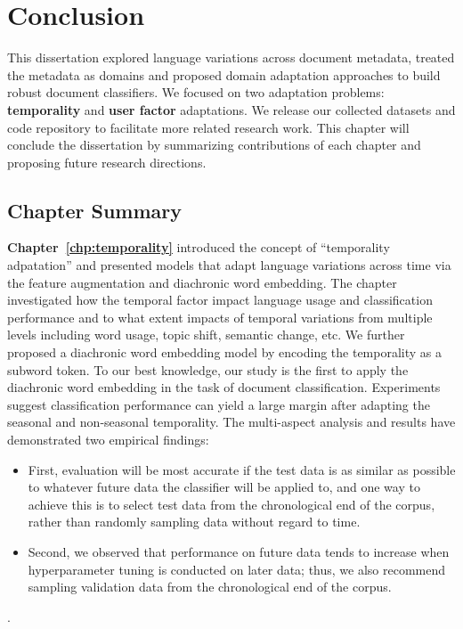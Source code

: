 \chapter{Conclusion}
\label{chp:conclusion}

This dissertation explored language variations across document metadata, treated the metadata as domains and proposed domain adaptation approaches to build robust document classifiers.
We focused on two adaptation problems: \textbf{temporality} and \textbf{user factor} adaptations.
We release our collected datasets and code repository to facilitate more related research work.
This chapter will conclude the dissertation by summarizing contributions of each chapter and proposing future research directions.

\section{Chapter Summary}


\textbf{Chapter~\ref{chp:temporality}} introduced the concept of ``temporality adpatation'' and presented models that adapt language variations across time via the feature augmentation and diachronic word embedding. 
The chapter investigated how the temporal factor impact language usage and classification performance and to what extent impacts of temporal variations from multiple levels including word usage, topic shift, semantic change, etc.
We further proposed a diachronic word embedding model by encoding the temporality as a subword token.
To our best knowledge, our study is the first to apply the diachronic word embedding in the task of document classification.
Experiments suggest classification performance can yield a large margin after adapting the seasonal and non-seasonal temporality.
The multi-aspect analysis and results have demonstrated two empirical findings:
\begin{itemize}
    \item First, evaluation will be most accurate if the test data is as similar as possible to whatever future data the classifier will be applied to, and one way to achieve this is to select test data from the chronological end of the corpus, rather than randomly sampling data without regard to time.
    \item Second, we observed that performance on future data tends to increase when hyperparameter tuning is conducted on later data; thus, we also recommend sampling validation data from the chronological end of the corpus.
\end{itemize}.

